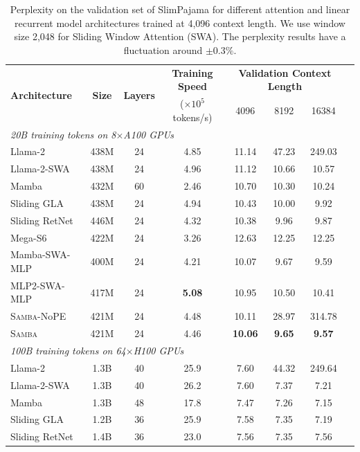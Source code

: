 \documentclass{article}
\begin{document}
\begin{table}[!htbp]
\centering
\small
\caption{Perplexity on the validation set of SlimPajama for different attention and linear recurrent model architectures trained at 4,096 context length. We use window size 2,048 for Sliding Window Attention (SWA). The perplexity results have a fluctuation around $\pm 0.3\%$.
} 
\begin{tabular}{lccccccc}
\toprule
\multirow{2}{*}{\bf Architecture} & \multirow{2}{*}{\bf Size } & \multirow{2}{*}{\bf Layers } & \bf Training Speed &  \multicolumn{3 }{c}{\bf Validation Context Length} \\
  & &   &($\times 10^5$ tokens/s) &  4096  &  8192  &   16384 \\ 
\midrule
\multicolumn{6}{l}{\emph{20B training tokens on 8$\times$A100 GPUs}} \\
\midrule
Llama-2     & 438M   & 24 & 4.85 & 11.14 & 47.23 & 249.03 \\
Llama-2-SWA & 438M   & 24 & 4.96 & 11.12 & 10.66 & 10.57 \\
Mamba & 432M    &  60 & 2.46 & 10.70  & 10.30 & 10.24  \\
Sliding GLA      & 438M  & 24  & 4.94 & 10.43 & 10.00 & 9.92 \\
Sliding RetNet & 446M & 24  & 4.32 & 10.38 & 9.96 & 9.87 \\


Mega-S6 & 422M & 24 & 3.26 & 12.63 & 12.25 & 12.25  \\
Mamba-SWA-MLP & 400M & 24 & 4.21 & 10.07 & 9.67 & 9.59  \\
MLP2-SWA-MLP & 417M & 24 & \bf 5.08 & 10.95 & 10.50 & 10.41 \\
\textsc{Samba}-NoPE & 421M  & 24  & 4.48 & 
 10.11  & 28.97 &  314.78 \\
\textsc{Samba} & 421M  & 24  & 4.46 & \bf 10.06  & \bf 9.65 & \bf 9.57 \\
\midrule
\multicolumn{6}{l}{\emph{100B training tokens on 64$\times$H100 GPUs}} \\
\midrule
Llama-2  & 1.3B   & 40  & 25.9 & 7.60  & 44.32 & 249.64 \\
Llama-2-SWA & 1.3B  & 40    &  26.2  & 7.60  & 7.37 & 7.21 \\
Mamba  & 1.3B  & 48 & 17.8  &   7.47  & 7.26&  7.15\\
Sliding GLA     & 1.2B & 36   & 25.9   &  7.58 &  7.35  &  7.19  \\
Sliding RetNet & 1.4B  & 36    & 23.0  & 7.56  & 7.35 & 7.56 \\



\end{tabular}
\end{table}
\end{document}
